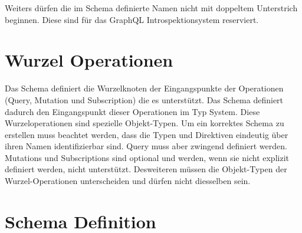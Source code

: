 Weiters dürfen die im Schema definierte Namen nicht mit doppeltem Unterstrich beginnen.
Diese sind für das GraphQL Introspektionsystem reserviert.
\cite[Abs. 3.3]{graphqlOnline}

\section{Wurzel Operationen}
Das Schema definiert die Wurzelknoten der Eingangspunkte der Operationen (Query, Mutation und Subscription) die es unterstützt.
Das Schema definiert dadurch den Eingangspunkt dieser Operationen im Typ System.
Diese Wurzeloperationen sind spezielle Objekt-Typen.
Um ein korrektes Schema zu erstellen muss beachtet werden, dass die Typen und Direktiven eindeutig über ihren Namen identifizierbar sind.
Query muss aber zwingend definiert werden. Mutations und Subscriptions sind optional und werden, wenn sie nicht explizit definiert werden, nicht unterstützt.
Desweiteren müssen die Objekt-Typen der Wurzel-Operationen unterscheiden und dürfen nicht diesselben sein. 
\newline


\section{Schema Definition}


